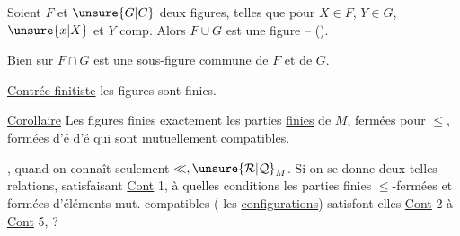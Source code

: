
  Soient $F$ et $\unsure{G|C}$ deux figures, telles que pour  \deleted{$\forall$}$X\in F$, $Y\in G$, $\unsure{x|X}$ et $Y$ comp.
Alors $F\cup G$ est une figure --  ().

Bien sur $F\cap G$ est une sous-figure commune de $F$ et de $G$.


\uline{Contrée finitiste}  les figures sont finies.  

\uline{Corollaire}  Les figures finies  exactement les parties \uline{finies} de $M$, fermées pour $\leq$, formées d'é  d'é  qui sont mutuellement compatibles.

,       quand on connaît seulement $\ll,\unsure{\mathcal R|\mathcal Q}_{M}$. 
Si on se donne deux telles relations,  satisfaisant \uline{Cont} 1, à quelles conditions les parties finies $\leq$-fermées  et formées d'éléments mut. compatibles ( les \uline{configurations}) satisfont-elles \uline{Cont} 2 à \uline{Cont} 5, ?
